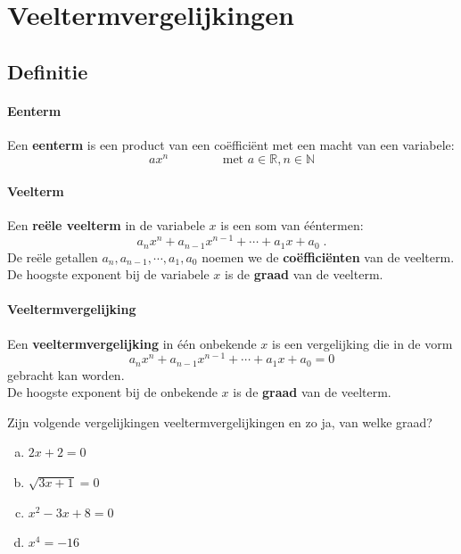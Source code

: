\documentclass[12pt]{article}
\begin{document}
\fancyhead[RE,LO]{}



\onehalfspacing

\section{Veeltermvergelijkingen}



\subsection{Definitie}

\paragraph{Eenterm}
\begin{mdframed}
Een {\bf eenterm} is een product van een coëfficiënt met een macht van een variabele:
$$ax^n\qquad\qquad\mbox{ met }a\in\mathbb{R}, n\in\mathbb{N}$$
\end{mdframed}

\paragraph{Veelterm}
\begin{mdframed}
  Een {\bf reële veelterm} in de variabele $x$ is een som van ééntermen:
  $$ a_nx^n + a_{n-1}x^{n-1} + \cdots + a_1x + a_0 \;.$$
  De reële getallen $a_n, a_{n-1}, \cdots, a_1, a_0$ noemen we de {\bf coëfficiënten} van de veelterm.
  De hoogste exponent bij de variabele $x$ is de {\bf graad} van de veelterm.
\end{mdframed}

\paragraph{Veeltermvergelijking}
\begin{mdframed}
  Een {\bf veeltermvergelijking} in één onbekende $x$ is een vergelijking die in de vorm
  $$a_nx^n + a_{n-1}x^{n-1} + \cdots + a_1x + a_0 = 0$$
  gebracht kan worden.\\
  De hoogste exponent bij de onbekende $x$ is de {\bf graad} van de veelterm.
\end{mdframed}



\begin{oefening}
  Zijn volgende vergelijkingen veeltermvergelijkingen en zo ja, van welke graad?
  \begin{multicols}{2}
    \begin{enumerate}[(a)]
    \item $2x + 2 = 0$
    \item $\sqrt{3x+1} = 0$
    \item $x^2-3x+8=0$
    \item $x^4=-16$
    \end{enumerate}
  \end{multicols}
\end{oefening}
\end{document}
